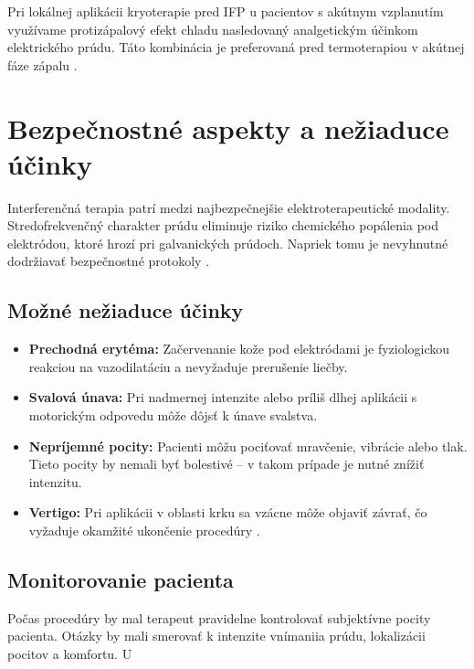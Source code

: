 Pri lokálnej aplikácii kryoterapie pred IFP u pacientov s akútnym vzplanutím využívame protizápalový efekt chladu nasledovaný analgetickým účinkom elektrického prúdu. Táto kombinácia je preferovaná pred termoterapiou v akútnej fáze zápalu \parencite{Podebradsky2009}.

\section{Bezpečnostné aspekty a nežiaduce účinky}

Interferenčná terapia patrí medzi najbezpečnejšie elektroterapeutické modality. Stredofrekvenčný charakter prúdu eliminuje riziko chemického popálenia pod elektródou, ktoré hrozí pri galvanických prúdoch. Napriek tomu je nevyhnutné dodržiavať bezpečnostné protokoly \parencite{Watson2020}.

\subsection{Možné nežiaduce účinky}

\begin{itemize}
    \item \textbf{Prechodná erytéma:} Začervenanie kože pod elektródami je fyziologickou reakciou na vazodilatáciu a nevyžaduje prerušenie liečby.
    \item \textbf{Svalová únava:} Pri nadmernej intenzite alebo príliš dlhej aplikácii s motorickým odpovedu môže dôjsť k únave svalstva.
    \item \textbf{Nepríjemné pocity:} Pacienti môžu pociťovať mravčenie, vibrácie alebo tlak. Tieto pocity by nemali byť bolestivé – v takom prípade je nutné znížiť intenzitu.
    \item \textbf{Vertigo:} Pri aplikácii v oblasti krku sa vzácne môže objaviť závrať, čo vyžaduje okamžité ukončenie procedúry \parencite{Goats1990}.
\end{itemize}

\subsection{Monitorovanie pacienta}

Počas procedúry by mal terapeut pravidelne kontrolovať subjektívne pocity pacienta. Otázky by mali smerovať k intenzite vnímaniia prúdu, lokalizácii pocitov a komfortu. U
